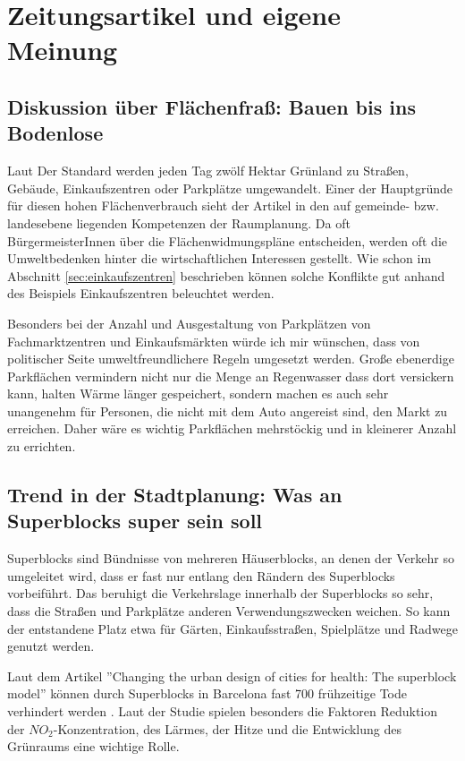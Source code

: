 \documentclass[]{article}
\begin{document}
\section{Zeitungsartikel und eigene Meinung}

\subsection{Diskussion über Flächenfraß: Bauen bis ins Bodenlose}
Laut Der Standard werden jeden Tag zwölf Hektar Grünland zu Straßen, Gebäude, Einkaufszentren oder Parkplätze umgewandelt.\cite{bauen_bis_ins_bodenlose} Einer der Hauptgründe für diesen hohen Flächenverbrauch sieht der Artikel in den auf gemeinde- bzw. landesebene liegenden Kompetenzen der Raumplanung. Da oft BürgermeisterInnen über die Flächenwidmungspläne entscheiden, werden oft die Umweltbedenken hinter die wirtschaftlichen Interessen gestellt. Wie schon im Abschnitt \ref{sec:einkaufszentren} beschrieben können solche Konflikte gut anhand des Beispiels Einkaufszentren beleuchtet werden.

Besonders bei der Anzahl und Ausgestaltung von Parkplätzen von Fachmarktzentren und Einkaufsmärkten würde ich mir wünschen, dass von politischer Seite umweltfreundlichere Regeln umgesetzt werden. Große ebenerdige Parkflächen vermindern nicht nur die Menge an Regenwasser dass dort versickern kann, halten Wärme länger gespeichert, sondern machen es auch sehr unangenehm für Personen, die nicht mit dem Auto angereist sind, den Markt zu erreichen. Daher wäre es wichtig Parkflächen mehrstöckig und in kleinerer Anzahl zu errichten.

\subsection{Trend in der Stadtplanung: Was an Superblocks super sein soll}
Superblocks sind Bündnisse von mehreren Häuserblocks, an denen der Verkehr so umgeleitet wird, dass er fast nur entlang den Rändern des Superblocks vorbeiführt. Das beruhigt die Verkehrslage innerhalb der Superblocks so sehr, dass die Straßen und Parkplätze anderen Verwendungszwecken weichen. So kann der entstandene Platz etwa für Gärten, Einkaufsstraßen, Spielplätze und Radwege genutzt werden.

Laut dem Artikel ''Changing the urban design of cities for health: The superblock model'' können durch Superblocks in Barcelona fast 700 frühzeitige Tode verhindert werden \cite{superblock_barcelona}. Laut der Studie spielen besonders die Faktoren Reduktion der $NO_2$-Konzentration, des Lärmes, der Hitze und die Entwicklung des Grünraums eine wichtige Rolle.
\end{document}

